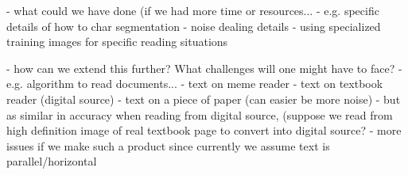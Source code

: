 \documentclass[11pt]{article}
\begin{document}
- what could we have done (if we had more time or resources...
    - e.g. specific details of how to char segmentation
    - noise dealing details
    - using specialized training images for specific
        reading situations
    
- how can we extend this further? What challenges will one might have to face?
    - e.g. algorithm to read documents...
    - text on meme reader
    - text on textbook reader (digital source)
    - text on a piece of paper (can easier be more noise)
        - but as similar in accuracy when reading from digital source, (suppose we read from high definition image of real textbook page to convert into digital source?
            - more issues if we make such a product since currently we assume text is parallel/horizontal
\fi

\clearpage


\end{document}
